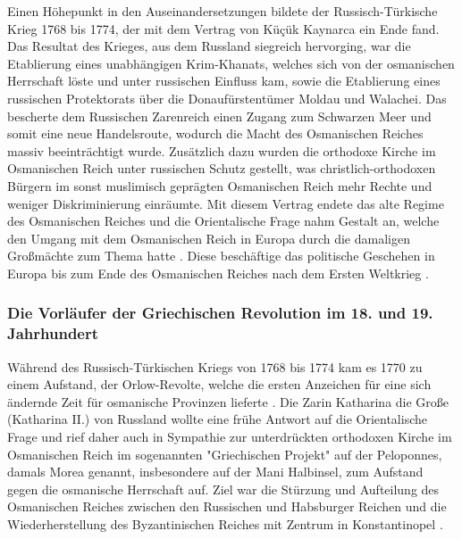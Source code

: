 \documentclass[preprint]{geomorphica} %
\begin{document}
Einen Höhepunkt in den Auseinandersetzungen bildete der Russisch-Türkische Krieg 1768 bis 1774, der mit dem Vertrag von Küçük Kaynarca ein Ende fand.
Das Resultat des Krieges, aus dem Russland siegreich hervorging, war die Etablierung eines unabhängigen Krim-Khanats, welches sich von der osmanischen Herrschaft löste und unter russischen Einfluss kam, sowie die Etablierung eines russischen Protektorats über die Donaufürstentümer Moldau und Walachei.
Das bescherte dem Russischen Zarenreich einen Zugang zum Schwarzen Meer und somit eine neue Handelsroute, wodurch die Macht des Osmanischen Reiches massiv beeinträchtigt wurde.
Zusätzlich dazu wurden die orthodoxe Kirche im Osmanischen Reich unter russischen Schutz gestellt, was christlich-orthodoxen Bürgern im sonst muslimisch geprägten Osmanischen Reich mehr Rechte und weniger Diskriminierung einräumte.
Mit diesem Vertrag endete das alte Regime des Osmanischen Reiches und die Orientalische Frage nahm Gestalt an, welche den Umgang mit dem Osmanischen Reich in Europa durch die damaligen Großmächte zum Thema hatte \cite{Kinross1979, Woodhouse1998, Cronin1995, Hösch1964}.
Diese beschäftige das politische Geschehen in Europa bis zum Ende des Osmanischen Reiches nach dem Ersten Weltkrieg \cite{Anderson1966}.

\subsubsection{Die Vorläufer der Griechischen Revolution im 18. und 19. Jahrhundert}

Während des Russisch-Türkischen Kriegs von 1768 bis 1774 kam es 1770 zu einem Aufstand, der Orlow-Revolte, welche die ersten Anzeichen für eine sich ändernde Zeit für osmanische Provinzen lieferte \cite{Dakin1973}.
Die Zarin Katharina die Große (Katharina II.) von Russland wollte eine frühe Antwort auf die Orientalische Frage und rief daher auch in Sympathie zur unterdrückten orthodoxen Kirche im Osmanischen Reich im sogenannten "Griechischen Projekt" auf der Peloponnes, damals Morea genannt, insbesondere auf der Mani Halbinsel, zum Aufstand gegen die osmanische Herrschaft auf.
Ziel war die Stürzung und Aufteilung des Osmanischen Reiches zwischen den Russischen und Habsburger Reichen und die Wiederherstellung des Byzantinischen Reiches mit Zentrum in Konstantinopel \cite{Anderson1966, Dakin1973, Brewer2012}.
\end{document}
